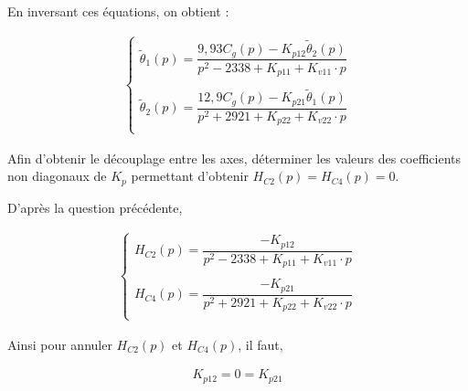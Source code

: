 \begin{corrige}
En inversant ces équations, on obtient : 

\begin{align*}
\left\{
\begin{array}{l}
\tilde{\theta}_1(p)=\dfrac{9,93C_g(p)-K_{p12}\tilde{\theta}_2(p)}{p^2-2338+K_{p11}+K_{v11}\cdot p}\\
\\
\tilde{\theta}_2(p)=\dfrac{12,9C_g(p)-K_{p21}\tilde{\theta}_1(p)}{p^2+2921+K_{p22}+K_{v22}\cdot p}\\
\end{array}
\right.
\end{align*}

\end{corrige}
\else
\fi

\begin{question}
\label{2023_ccs_psi_q_27}
Afin d'obtenir le découplage entre les axes, déterminer les valeurs des coefficients non diagonaux de $K_{p}$ permettant d'obtenir $H_{C 2}(p)=H_{C 4}(p)=0$.\\
\end{question}
\ifprof
\begin{corrige}
D'après la question précédente,

\begin{align*}
\left\{
\begin{array}{l}
H_{C2}(p)=\dfrac{-K_{p12}}{p^2-2338+K_{p11}+K_{v11}\cdot p}\\
\\
H_{C4}(p)=\dfrac{-K_{p21}}{p^2+2921+K_{p22}+K_{v22}\cdot p}\\
\end{array}
\right.
\end{align*}

Ainsi pour annuler $H_{C2}(p)$ et $H_{C4}(p)$, il faut,

\begin{align*}
K_{p12}=0=K_{p21}
\end{align*}
\end{corrige}
\else
\fi

